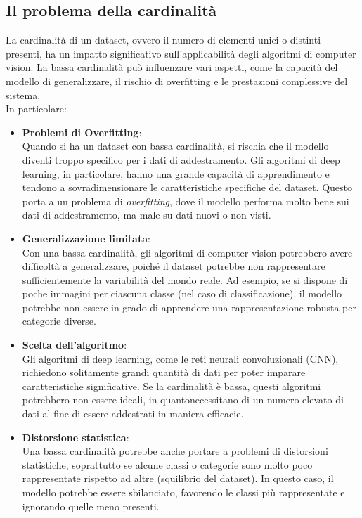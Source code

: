 \documentclass[12pt,a4paper,openright,twoside]{book}
\begin{document}
\subsection{Il problema della cardinalità}
La cardinalità di un dataset, ovvero il numero di elementi unici o distinti presenti, ha un impatto significativo sull'applicabilità degli algoritmi di computer vision. La bassa cardinalità può influenzare vari aspetti, come la capacità del modello di generalizzare, il rischio di overfitting e le prestazioni complessive del sistema.\\
In particolare: 
\begin{itemize}
\item \textbf{Problemi di Overfitting}:\\
Quando si ha un dataset con bassa cardinalità, si rischia che il modello diventi troppo specifico per i dati di addestramento. Gli algoritmi di deep learning, in particolare, hanno una grande capacità di apprendimento e tendono a sovradimensionare le caratteristiche specifiche del dataset. Questo porta a un problema di {\itshape overfitting}, dove il modello performa molto bene sui dati di addestramento, ma male su dati nuovi o non visti.

\item \textbf{Generalizzazione limitata}:\\
Con una bassa cardinalità, gli algoritmi di computer vision potrebbero avere difficoltà a generalizzare, poiché il dataset potrebbe non rappresentare sufficientemente la variabilità del mondo reale. Ad esempio, se si dispone di poche immagini per ciascuna classe (nel caso di classificazione), il modello potrebbe non essere in grado di apprendere una rappresentazione robusta per categorie diverse.

\item \textbf{Scelta dell'algoritmo}:\\
Gli algoritmi di deep learning, come le reti neurali convoluzionali (CNN), richiedono solitamente grandi quantità di dati per poter imparare caratteristiche significative. Se la cardinalità è bassa, questi algoritmi potrebbero non essere ideali, in quantonecessitano di un numero elevato di dati al fine di essere addestrati in maniera efficacie.

\item \textbf{Distorsione statistica}:\\
Una bassa cardinalità potrebbe anche portare a problemi di distorsioni statistiche, soprattutto se alcune classi o categorie sono molto poco rappresentate rispetto ad altre (squilibrio del dataset). In questo caso, il modello potrebbe essere sbilanciato, favorendo le classi più rappresentate e ignorando quelle meno presenti.
\end{itemize}
\end{document}
